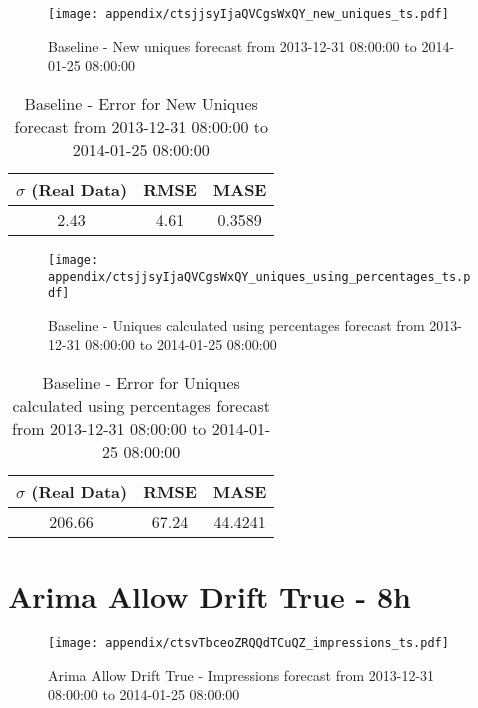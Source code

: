 \begin{figure}[H] \begin{center} \leavevmode
\texttt{[image: appendix/ctsjjsyIjaQVCgsWxQY\_new\_uniques\_ts.pdf]} \caption{
Baseline - New uniques forecast from 2013-12-31 08:00:00 to 2014-01-25 08:00:00} \label{fig:appendix/ctsjjsyIjaQVCgsWxQY_new_uniques_ts.pdf} \end{center}
\end{figure}

\begin{table}[H]
\centering
\footnotesize
\begin{tabular}{ccc}
$\sigma$ (Real Data) & RMSE & MASE   \\ \hline
2.43 & 4.61 & 0.3589 \\
\end{tabular}

\vspace{0.5cm}

\caption{
Baseline - Error for New Uniques forecast from 2013-12-31 08:00:00 to 2014-01-25 08:00:00}
\end{table}

\begin{figure}[H] \begin{center} \leavevmode
\texttt{[image: appendix/ctsjjsyIjaQVCgsWxQY\_uniques\_using\_percentages\_ts.pdf]} \caption{
Baseline - Uniques calculated using percentages forecast from 2013-12-31 08:00:00 to 2014-01-25 08:00:00} \label{fig:appendix/ctsjjsyIjaQVCgsWxQY_uniques_using_percentages_ts.pdf} \end{center}
\end{figure}

\begin{table}[H]
\centering
\footnotesize
\begin{tabular}{ccc}
$\sigma$ (Real Data) & RMSE & MASE   \\ \hline
206.66 & 67.24 & 44.4241 \\
\end{tabular}

\vspace{0.5cm}

\caption{
Baseline - Error for Uniques calculated using percentages forecast from 2013-12-31 08:00:00 to 2014-01-25 08:00:00}
\end{table}

\section{Arima Allow Drift True - 8h}
\begin{figure}[H] \begin{center} \leavevmode
\texttt{[image: appendix/ctsvTbceoZRQQdTCuQZ\_impressions\_ts.pdf]} \caption{
Arima Allow Drift True - Impressions forecast from 2013-12-31 08:00:00 to 2014-01-25 08:00:00} \label{fig:appendix/ctsvTbceoZRQQdTCuQZ_impressions_ts.pdf} \end{center}
\end{figure}

